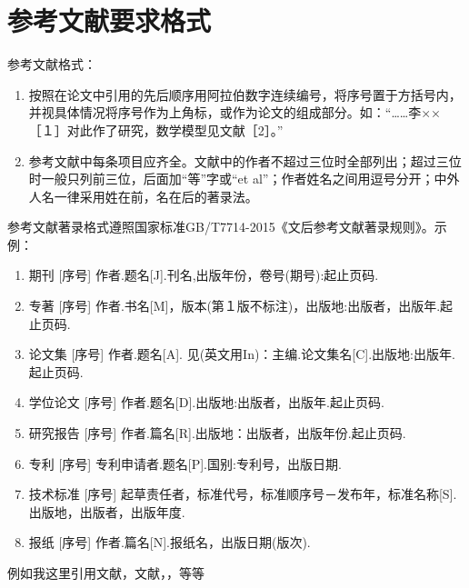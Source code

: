 \chapter{参考文献要求格式}

参考文献格式：
\begin{enumerate}[label=\arabic*.~~]
    \item 按照在论文中引用的先后顺序用阿拉伯数字连续编号，将序号置于方括号内，并视具体情况将序号作为上角标，或作为论文的组成部分。如：“……李××［１］对此作了研究，数学模型见文献［2］。” 
    \item 参考文献中每条项目应齐全。文献中的作者不超过三位时全部列出；超过三位时一般只列前三位，后面加“等”字或“et al”；作者姓名之间用逗号分开；中外人名一律采用姓在前，名在后的著录法。
\end{enumerate}

参考文献著录格式遵照国家标准GB/T7714-2015《文后参考文献著录规则》。示例：
\begin{enumerate}[label=（\arabic*）]
    \item 期刊
    [序号] 作者.题名[J].刊名,出版年份，卷号(期号):起止页码.
    \item 专著
    [序号] 作者.书名[M]，版本(第１版不标注)，出版地:出版者，出版年.起止页码.
    \item 论文集
    [序号] 作者.题名[A]. 见(英文用In)：主编.论文集名[C].出版地:出版年.起止页码.
    \item 学位论文
    [序号] 作者.题名[D].出版地:出版者，出版年.起止页码.
    \item 研究报告
    [序号] 作者.篇名[R].出版地：出版者，出版年份.起止页码.
    \item 专利
    [序号] 专利申请者.题名[P].国别:专利号，出版日期.
    \item 技术标准
    [序号] 起草责任者，标准代号，标准顺序号－发布年，标准名称[S].出版地，出版者，出版年度.
    \item 报纸
    [序号] 作者.篇名[N].报纸名，出版日期(版次).
\end{enumerate}

例如我这里引用文献\cite{2001Applying}，文献\cite{2004PSO_ZhangLibiao}，\cite{2005Improve_JinYixiong}，\cite{2021A}等等
